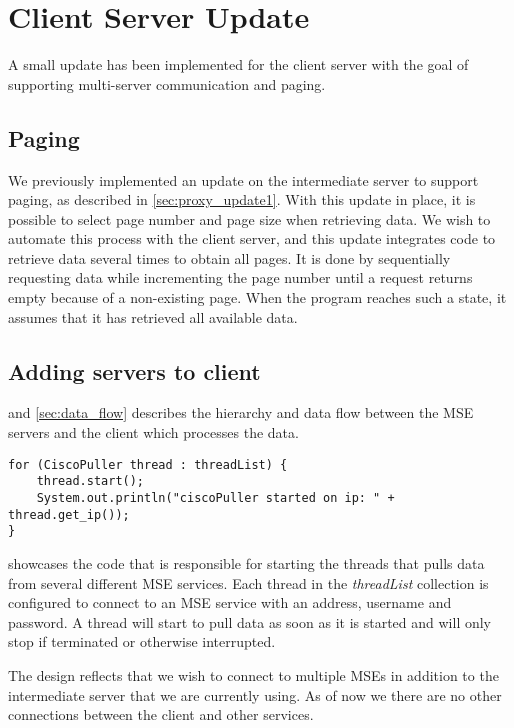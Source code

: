 \section{Client Server Update}
A small update has been implemented for the client server with the goal of supporting multi-server communication and paging.

\subsection*{Paging}
We previously implemented an update on the intermediate server to support paging, as described in \cref{sec:proxy_update1}. With this update in place, it is possible to select page number and page size when retrieving data. We wish to automate this process with the client server, and this update integrates code to retrieve data several times to obtain all pages. It is done by sequentially requesting data while incrementing the page number until a request returns empty because of a non-existing page. When the program reaches such a state, it assumes that it has retrieved all available data.

\subsection*{Adding servers to client}
 and \cref{sec:data_flow} describes the hierarchy and data flow between the MSE servers and the client which processes the data. 
\begin{lstlisting}[caption={Starting threads to pull data from multiple MSE servers}, label={lst:cisco_puller}, language=inc_Java]
for (CiscoPuller thread : threadList) {
    thread.start();
    System.out.println("ciscoPuller started on ip: " + thread.get_ip());
}
\end{lstlisting}
 showcases the code that is responsible for starting the threads that pulls data from several different MSE services. Each thread in the \textit{threadList} collection is configured to connect to an MSE service with an address, username and password. A thread will start to pull data as soon as it is started and will only stop if terminated or otherwise interrupted.

The design reflects that we wish to connect to multiple MSEs in addition to the intermediate server that we are currently using. As of now we there are no other connections between the client and other services.